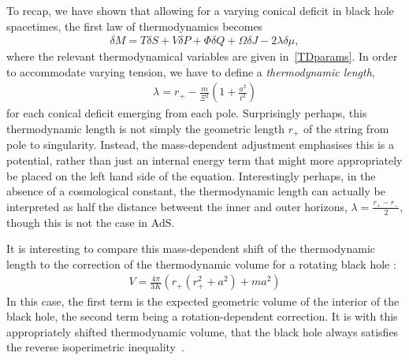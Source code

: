 \documentclass[
twoside,
openright,
frontopenright,
]{dmathesis}
\begin{document}
To recap, we have shown that allowing for a varying conical deficit
in black hole spacetimes, the first law of thermodynamics becomes
\begin{align}
\delta M = T \delta S + V\delta P + \Phi \delta Q +\Omega\delta J - 2\lambda \delta \mu,
\end{align}
where the relevant thermodynamical variables are given in~\eqref{TDparams}.
In order to accommodate varying 
tension, we have to define a \emph{thermodynamic length},
\begin{align}\lambda = r_+ -
\frac{m}{\Xi^2}\left(1+\frac{a^2}{\ell^2}\right)
\end{align}
for each conical deficit emerging from each pole. Surprisingly perhaps, this
thermodynamic length is not simply the geometric length $r_+$ of the string from
pole to singularity.  Instead, the mass-dependent adjustment emphasises this is
a potential, rather than just an internal energy term that might more
appropriately be placed on the left hand side of the equation. Interestingly
perhaps, in the absence of a cosmological constant, the thermodynamic length can
actually be interpreted as half the distance betweent the inner and outer horizons,
$\lambda = \frac{r_+ - r_-}{2}$, though this is not the case in AdS.

It is interesting to compare this mass-dependent shift of the thermodynamic
length to the correction of the thermodynamic volume for a rotating black
hole \cite{Cvetic:2010jb,Dolan:2011jm}:
\begin{align}
V = \frac{4\pi}{3K} \left(r_+(r_+^2+a^2) + m a^2\right)
\end{align}
In this case, the first term is the expected geometric volume of the interior of
the black hole, the second term being a rotation-dependent correction. It is
with this appropriately shifted thermodynamic volume, that the black hole always
satisfies the reverse isoperimetric inequality~\cite{Cvetic:2010jb}.
\end{document}
